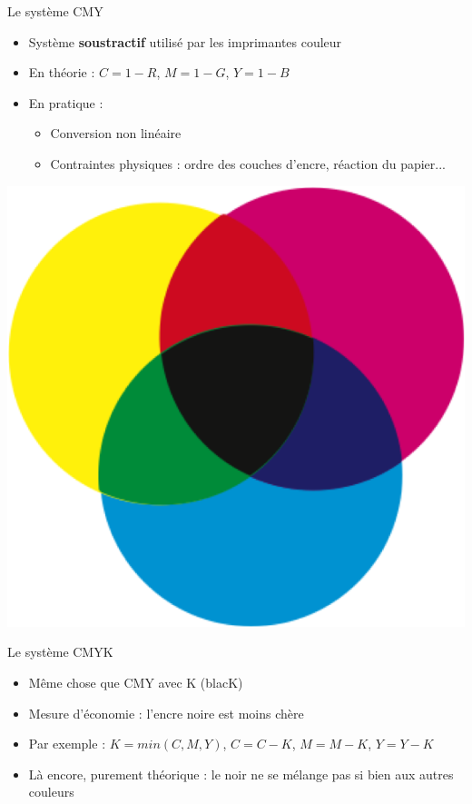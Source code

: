 \begin{frame}{Le système CMY}
\begin{itemize}
\item Système \textbf{soustractif} utilisé par les imprimantes couleur
\item En théorie : $C=1-R$, $M=1-G$, $Y=1-B$
\item En pratique :
\begin{itemize}
\item Conversion non linéaire
\item Contraintes physiques : ordre des couches d'encre, réaction du papier...
\end{itemize}
\end{itemize}
\begin{center}
\includegraphics[height=.5\textheight]{figs/cmyk.png}

\end{center}
\end{frame}

\begin{frame}{Le système CMYK}
\begin{itemize}
\item Même chose que CMY avec K (blacK)
\item Mesure d'économie : l'encre noire est moins chère
\item Par exemple : $K=min(C,M,Y)$, $C=C-K$, $M=M-K$, $Y=Y-K$
\item Là encore, purement théorique : le noir ne se mélange pas si bien aux autres couleurs
\end{itemize}
\end{frame}

